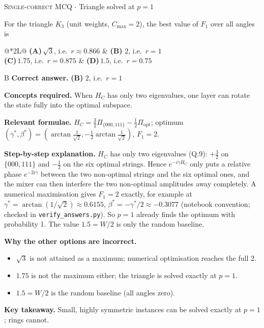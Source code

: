 \documentclass[11pt,a4paper]{article}
\newcommand{\optlabel}[1]{\textbf{(#1)}}
\newcommand{\correctlabel}[1]{\textcolor{okgreen}{\textbf{(#1)}\,\ding{51}}}
\newenvironment{qitem}[1]{\begin{list}{}{\setlength{\leftmargin}{3.3em}\setlength{\labelwidth}{3.1em}%
  \setlength{\labelsep}{0.2em}\setlength{\topsep}{3pt}\setlength{\parsep}{3pt}}\item[\textbf{Q.#1}\hfill]}{\end{list}}
\newcommand{\qsep}{\par\vspace{2pt}{\color{black!15}\hrule}\vspace{4pt}}
\newcommand{\qmeta}[2]{{\footnotesize\color{black!60}\textsc{#1} \;$\cdot$\; #2}\par}
\begin{document}
\begin{qitem}{56}
\qmeta{Single-correct MCQ}{Triangle solved at $p = 1$}
For the triangle $K_3$ (unit weights, $C_{\max} = 2$), the best value of $F_1$ over all angles is
\par\smallskip\noindent\begin{tabularx}{\linewidth}{@{}*{2}{L}@{}}
\optlabel{A}\,$\sqrt3$, i.e.\ $r \approx 0.866$ & \correctlabel{B}\,$2$, i.e.\ $r = 1$ \\[3pt]
\optlabel{C}\,$1.75$, i.e.\ $r = 0.875$ & \optlabel{D}\,$1.5$, i.e.\ $r = 0.75$
\end{tabularx}
\end{qitem}
\begin{solbox}{B}
\textbf{\color{brand}Correct answer.} \textcolor{okgreen}{\textbf{(B)}} $2$, i.e.\ $r = 1$

\textbf{\color{brand}Concepts required.} When $H_C$ has only two eigenvalues, one layer can rotate the state fully into the optimal subspace.

\textbf{\color{brand}Relevant formulae.} $H_C = \tfrac32\Pi_{\{000,111\}} - \tfrac12\Pi_{\text{opt}}$; optimum $(\gamma^*, \beta^*) = (\arctan\tfrac{1}{\sqrt2}, -\tfrac12\arctan\tfrac1{\sqrt2})$, $F_1 = 2$.

\textbf{\color{brand}Step-by-step explanation.} $H_C$ has only two eigenvalues (Q.9): $+\tfrac32$ on $\{000, 111\}$ and $-\tfrac12$ on the six optimal strings. Hence
$e^{-i\gamma H_C}$ only puts a relative phase $e^{-2i\gamma}$ between the two non-optimal strings and the six optimal ones, and the
mixer can then interfere the two non-optimal amplitudes away completely. A numerical maximisation gives $F_1 = 2$ exactly, for
example at $\gamma^* = \arctan(1/\sqrt2) \approx 0.6155$, $\beta^* = -\gamma^*/2 \approx -0.3077$ (notebook convention; checked
in \texttt{verify\_answers.py}). So $p = 1$ already finds the optimum with probability 1. The value $1.5 = W/2$ is only the
random baseline.

\textbf{\color{brand}Why the other options are incorrect.}
\begin{itemize}[leftmargin=2.4em, itemsep=1pt, topsep=2pt]
\item[\textbf{(A)}] $\sqrt3$ is not attained as a maximum; numerical optimisation reaches the full $2$.
\item[\textbf{(C)}] $1.75$ is not the maximum either; the triangle is solved exactly at $p = 1$.
\item[\textbf{(D)}] $1.5 = W/2$ is the random baseline (all angles zero).
\end{itemize}
\textbf{\color{brand}Key takeaway.} Small, highly symmetric instances can be solved exactly at $p = 1$; rings cannot.
\end{solbox}
\qsep
\end{document}
